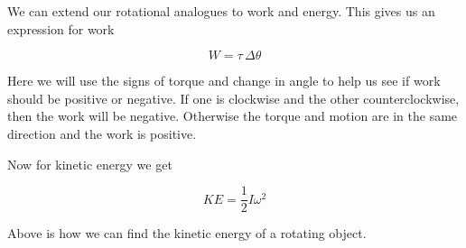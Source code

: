 \documentclass[12pt]{book}
\begin{document}
We can extend our rotational analogues to work and energy. This gives us an expression for work

\begin{equation}
W = \tau \, \Delta \theta
\end{equation}

Here we will use the signs of torque and change in angle to help us see if work should be positive or negative. If one is clockwise and the other counterclockwise, then the work will be negative. Otherwise the torque and motion are in the same direction and the work is positive.

Now for kinetic energy we get

\begin{equation}
KE = \frac{1}{2} I \omega^2
\end{equation}

Above is how we can find the kinetic energy of a rotating object.
\end{document}
